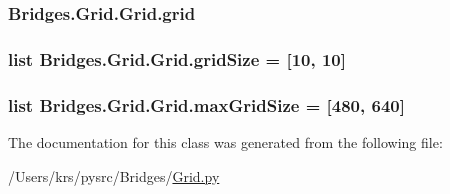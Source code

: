 \subsubsection[{grid}]{\setlength{\rightskip}{0pt plus 5cm}Bridges.\+Grid.\+Grid.\+grid}\label{class_bridges_1_1_grid_1_1_grid_a7e3fd2bd085616102e390737a096bcac}
\hypertarget{class_bridges_1_1_grid_1_1_grid_ace0915cd8922ad37d390e08a3a370700}{}
\subsubsection[{grid\+Size}]{\setlength{\rightskip}{0pt plus 5cm}list Bridges.\+Grid.\+Grid.\+grid\+Size = \mbox{[}10, 10\mbox{]}\hspace{0.3cm}{\ttfamily [static]}}\label{class_bridges_1_1_grid_1_1_grid_ace0915cd8922ad37d390e08a3a370700}
\hypertarget{class_bridges_1_1_grid_1_1_grid_aca620cf7545089b3bb603a7bd035afd6}{}
\subsubsection[{max\+Grid\+Size}]{\setlength{\rightskip}{0pt plus 5cm}list Bridges.\+Grid.\+Grid.\+max\+Grid\+Size = \mbox{[}480, 640\mbox{]}\hspace{0.3cm}{\ttfamily [static]}}\label{class_bridges_1_1_grid_1_1_grid_aca620cf7545089b3bb603a7bd035afd6}


The documentation for this class was generated from the following file\+:\begin{DoxyCompactItemize}
\item 
/\+Users/krs/pysrc/\+Bridges/\hyperlink{_grid_8py}{Grid.\+py}\end{DoxyCompactItemize}
